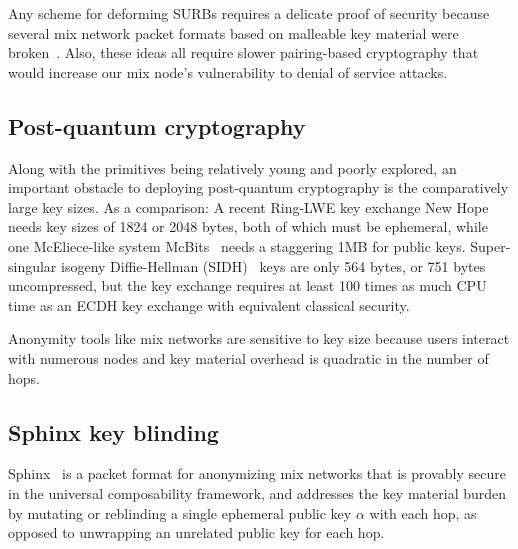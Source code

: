 \documentclass[twoside,letterpaper]{llncs}
\begin{document}
Any scheme for deforming SURBs requires a delicate proof of security
because several mix network packet formats based on malleable key
material were broken~\cite{Danezis2006}. 
Also, these ideas all require slower pairing-based cryptography that
would increase our mix node's vulnerability to denial of service attacks. 


\subsection{Post-quantum cryptography}

Along with the primitives being relatively young and poorly explored,
an important obstacle to deploying post-quantum cryptography is
the comparatively large key sizes.  As a comparison: 
%
A recent Ring-LWE key exchange New Hope~\cite[\S7, p.10]{NewHope} needs
 key sizes of 1824 or 2048 bytes, both of which must be ephemeral,
while one McEliece-like system McBits~\cite{McBits,InitRec}
 needs a staggering 1MB for public keys.
%
Super-singular isogeny Diffie-Hellman (SIDH)~\cite[p. 21]{SIDH-2016} keys
are only 564 bytes, or 751 bytes uncompressed, but
 the key exchange requires at least 100 times as much CPU time as
 an ECDH key exchange with equivalent classical security.

Anonymity tools like mix networks are sensitive to key size because 
users interact with numerous nodes and key material overhead is 
quadratic in the number of hops. %


\subsection{Sphinx key blinding}


Sphinx~\cite{Sphinx} is a packet format for anonymizing mix networks
that is provably secure in the universal composability framework, and
 addresses the key material burden by mutating or reblinding a
 single ephemeral public key $\alpha$ with each hop,
 as opposed to unwrapping an unrelated public key for each hop.
\end{document}
